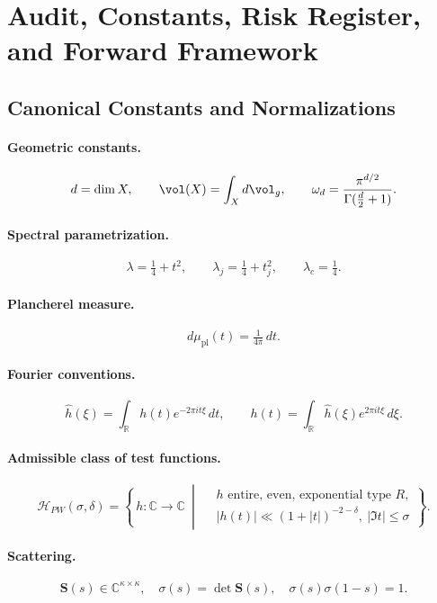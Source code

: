 \section{Audit, Constants, Risk Register, and Forward Framework}
\label{sec:audit-constants-framework}

\subsection{Canonical Constants and Normalizations}

\paragraph{Geometric constants.}
\[
d = \dim X, 
\qquad \vol(X) = \int_X d\vol_g,
\qquad \omega_d = \frac{\pi^{d/2}}{\Gamma(\tfrac{d}{2}+1)}.
\]

\paragraph{Spectral parametrization.}
\[
\lambda = \tfrac{1}{4}+t^2, 
\qquad \lambda_j = \tfrac{1}{4}+t_j^2, 
\qquad \lambda_c = \tfrac{1}{4}.
\]

\paragraph{Plancherel measure.}
\[
d\mu_{\mathrm{pl}}(t) = \tfrac{1}{4\pi}\,dt.
\]

\paragraph{Fourier conventions.}
\[
\widehat h(\xi) = \int_{\mathbb{R}} h(t)e^{-2\pi i t\xi}\,dt,
\qquad 
h(t) = \int_{\mathbb{R}}\widehat h(\xi)e^{2\pi i t\xi}\,d\xi.
\]

\paragraph{Admissible class of test functions.}
\[
\mathcal H_{PW}(\sigma,\delta) =
\left\{\, h:\mathbb{C}\to\mathbb{C}\ \middle|\ 
\begin{aligned}
 &h \text{ entire, even, exponential type } R,\\
 &|h(t)| \ll (1+|t|)^{-2-\delta},\ |\Im t|\le\sigma 
\end{aligned}\right\}.
\]

\paragraph{Scattering.}
\[
\mathbf{S}(s)\in \mathbb{C}^{\kappa\times\kappa},\quad
\sigma(s) = \det\mathbf{S}(s),\quad
\sigma(s)\sigma(1-s)=1.
\]

